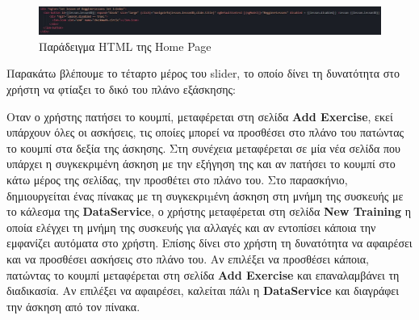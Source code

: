 \documentclass[a4paper,12pt]{article}
\begin{document}
			\vspace*{1cm}

			\begin{figure}[!htb]
				\begin{center}
					\caption{Παράδειγμα HTML της Home Page}
					\vspace*{0.5cm}

					\includegraphics[width=\linewidth]{homeHtml} 
				\end{center}
			\end{figure}

			Παρακάτω βλέπουμε το τέταρτο μέρος του slider, το οποίο δίνει τη δυνατότητα στο χρήστη να φτίαξει το δικό του πλάνο εξάσκησης:
			
			\newpage
			Οταν ο χρήστης πατήσει το κουμπί, μεταφέρεται στη σελίδα \textbf{Add Exercise}, εκεί υπάρχουν όλες οι ασκήσεις, τις οποίες μπορεί να προσθέσει 
			στο πλάνο του πατώντας το κουμπί στα δεξία της άσκησης. Στη συνέχεια μεταφέρεται σε μία νέα σελίδα που υπάρχει η συγκεκριμένη άσκηση με την εξήγηση της και αν πατήσει το κουμπί
			στο κάτω μέρος της σελίδας, την προσθέτει στο πλάνο του. Στο παρασκήνιο, δημιουργείται ένας πίνακας με τη συγκεκριµένη άσκηση στη μνήμη της συσκευής με το κάλεσμα της \textbf{DataService},
			ο χρήστης μεταφέρεται στη σελίδα \textbf{New Training}
			η οποία ελέγχει τη μνήμη της συσκευής για αλλαγές και αν εντοπίσει κάποια την εμφανίζει αυτόματα στο χρήστη. Επίσης
			δίνει στο χρήστη τη δυνατότητα να αφαιρέσει και να προσθέσει ασκήσεις στο πλάνο του. Αν επιλέξει να προσθέσει κάποια, πατώντας το κουμπί
			μεταφέρεται στη σελίδα \textbf{Add Exercise} και επαναλαμβάνει τη διαδικασία. Αν επιλέξει να αφαιρέσει, καλείται πάλι 
			η \textbf{DataService} και διαγράφει την άσκηση από τον πίνακα.
			
			\vspace*{1cm}
\end{document}
